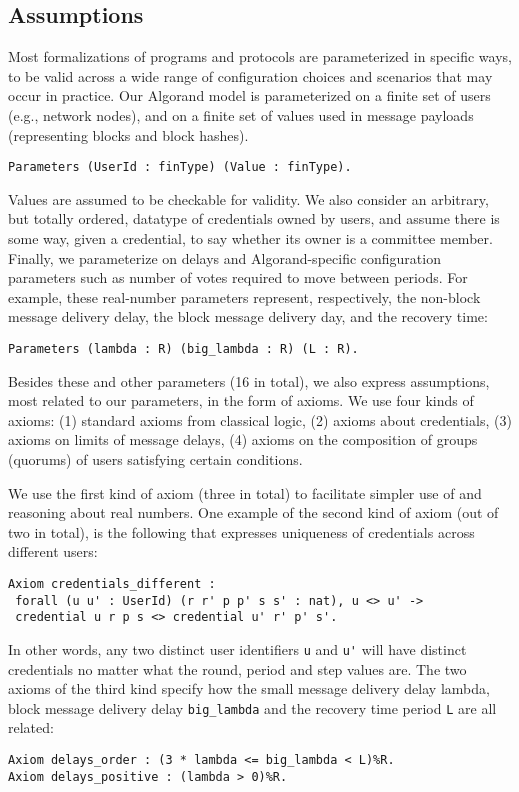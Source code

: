 \subsection{Assumptions}

Most formalizations of programs and protocols are parameterized in specific ways, to be valid across a wide range of configuration choices and scenarios that may occur in practice. Our Algorand model is parameterized on a finite set of users (e.g., network nodes), and on a finite set of values used in message payloads (representing blocks and block hashes). 

\begin{lstlisting}[language=Coq]
Parameters (UserId : finType) (Value : finType).
\end{lstlisting}

Values are assumed to be checkable for validity. We also consider an arbitrary, but totally ordered, datatype of credentials owned by users, and assume there is some way, given a credential, to say whether its owner is a committee member. Finally, we parameterize on delays and Algorand-specific configuration parameters such as number of votes required to move between periods. For example, these real-number parameters represent, respectively, the non-block message delivery delay, the block message delivery day, and the recovery time:
\begin{lstlisting}[language=Coq]
Parameters (lambda : R) (big_lambda : R) (L : R).
\end{lstlisting}

Besides these and other parameters (16 in total), we also express assumptions, most related to our parameters, in the form of axioms. We use four kinds of axioms:
(1) standard axioms from classical logic, (2) axioms about credentials, (3) axioms on limits of message delays, (4) axioms on the composition of groups (quorums) of users satisfying certain conditions.

We use the first kind of axiom (three in total) to facilitate simpler use of and reasoning about real numbers.
One example of the second kind of axiom (out of two in total), is the following that expresses uniqueness of credentials
across different users:
\begin{lstlisting}[language=Coq]
Axiom credentials_different :
 forall (u u' : UserId) (r r' p p' s s' : nat), u <> u' ->
 credential u r p s <> credential u' r' p' s'.
\end{lstlisting}
In other words, any two distinct user identifiers \lstinline{u} and \lstinline{u'} will have distinct credentials no matter what the round, period and step values are.
The two axioms of the third kind specify how the small message delivery delay lambda, block message delivery delay \lstinline{big_lambda} and the recovery time period \lstinline{L} are all related:
\begin{lstlisting}[language=Coq]
Axiom delays_order : (3 * lambda <= big_lambda < L)%R.
Axiom delays_positive : (lambda > 0)%R.
\end{lstlisting}

